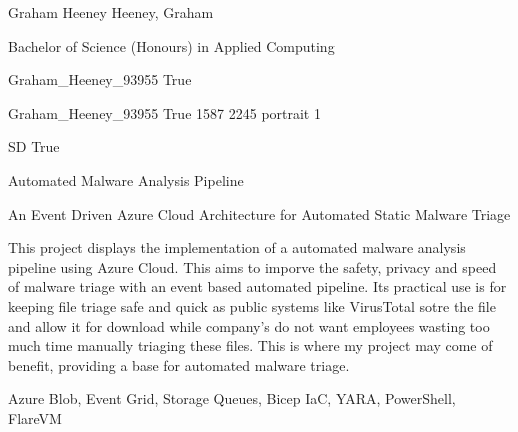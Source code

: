 
\begingroup{}\relax



\def\Key{Graham_Heeney_93955}

{Graham Heeney}
{Heeney, Graham}

{Bachelor of Science (Honours) in Applied Computing}

{Graham_Heeney_93955}
{True}

{Graham_Heeney_93955}
{True}
{1587}
{2245}
{portrait}
{1}

{SD}
{True}

{Automated Malware Analysis Pipeline}

{An Event Driven Azure Cloud Architecture for Automated Static Malware Triage}

{This project displays the implementation of a automated malware analysis pipeline using Azure Cloud. This aims to imporve the safety, privacy and speed of malware triage with an event based automated pipeline. Its practical use is for keeping file triage safe and quick as public systems like VirusTotal sotre the file and allow it for download while company's do not want employees wasting too much time manually triaging these files. This is where my project may come of benefit, providing a base for automated malware triage.}

{Azure Blob, Event Grid, Storage Queues, Bicep IaC, YARA, PowerShell, FlareVM}

